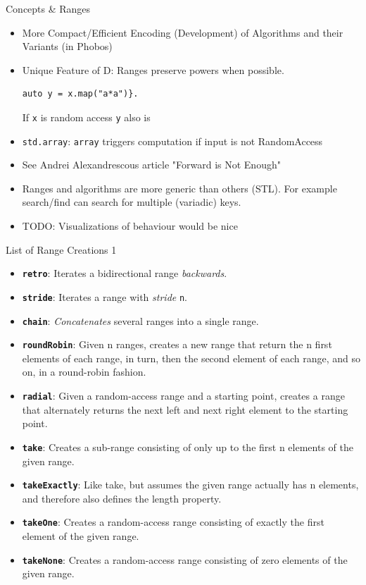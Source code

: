 \documentclass[xcolor=dvipsnames]{beamer}
\begin{document}
\begin{frame}[fragile]{Concepts \& Ranges}
  \begin{itemize}[<+->]
  \item More Compact/Efficient Encoding (Development) of Algorithms and their
    Variants (in Phobos)
  \item Unique Feature of D: Ranges preserve powers when possible.
    \begin{lstlisting}[frame=single]
auto y = x.map("a*a")}.
    \end{lstlisting}
      If \texttt{x} is random access \texttt{y} also is
  \item \texttt{std.array}: \texttt{array} triggers computation if input is not RandomAccess
  \item See Andrei Alexandrescous article "Forward is Not Enough"
  \item Ranges and algorithms are more generic than others (STL). For example
    search/find can search for multiple (variadic) keys.
  \item TODO: Visualizations of behaviour would be nice
  \end{itemize}
\end{frame}

\begin{frame}[fragile]{List of Range Creations 1}
  \begin{itemize}[<+->]
  \item \textbf{\texttt{retro}}: Iterates a bidirectional range \emph{backwards}.
  \item \textbf{\texttt{stride}}: Iterates a range with \emph{stride} \texttt{n}.
  \item \textbf{\texttt{chain}}: \emph{Concatenates} several ranges into a single range.
  \item \textbf{\texttt{roundRobin}}: Given n ranges, creates a new range that return the
    n first elements of each range, in turn, then the second element of each
    range, and so on, in a round-robin fashion.
  \item \textbf{\texttt{radial}}: Given a random-access range and a starting point,
    creates a range that alternately returns the next left and next right
    element to the starting point.
  \item \textbf{\texttt{take}}: Creates a sub-range consisting of only up to the first n
    elements of the given range.
  \item \textbf{\texttt{takeExactly}}: Like take, but assumes the given range actually
    has n elements, and therefore also defines the length property.
  \item \textbf{\texttt{takeOne}}: Creates a random-access range consisting of exactly
    the first element of the given range.
  \item \textbf{\texttt{takeNone}}: Creates a random-access range consisting of zero elements of the given range.
  \end{itemize}
\end{frame}
\end{document}
